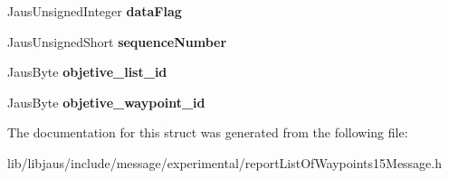 \begin{DoxyCompactItemize}
\item 
\hypertarget{struct_report_list_of_waypoints15_message_struct_affc0e770bcc48d1ed22a4da96e2a566c}{\-Jaus\-Unsigned\-Integer {\bfseries data\-Flag}}\label{struct_report_list_of_waypoints15_message_struct_affc0e770bcc48d1ed22a4da96e2a566c}

\item 
\hypertarget{struct_report_list_of_waypoints15_message_struct_ab9f2141cb0065ac1f93caf08f76dc0bc}{\-Jaus\-Unsigned\-Short {\bfseries sequence\-Number}}\label{struct_report_list_of_waypoints15_message_struct_ab9f2141cb0065ac1f93caf08f76dc0bc}

\item 
\hypertarget{struct_report_list_of_waypoints15_message_struct_a6d00d772650125322cbdd72819b0641d}{\-Jaus\-Byte {\bfseries objetive\-\_\-list\-\_\-id}}\label{struct_report_list_of_waypoints15_message_struct_a6d00d772650125322cbdd72819b0641d}

\item 
\hypertarget{struct_report_list_of_waypoints15_message_struct_a7bb4ffb237266fa2bf563a842f4b7848}{\-Jaus\-Byte {\bfseries objetive\-\_\-waypoint\-\_\-id}}\label{struct_report_list_of_waypoints15_message_struct_a7bb4ffb237266fa2bf563a842f4b7848}

\end{DoxyCompactItemize}


\-The documentation for this struct was generated from the following file\-:\begin{DoxyCompactItemize}
\item 
lib/libjaus/include/message/experimental/report\-List\-Of\-Waypoints15\-Message.\-h\end{DoxyCompactItemize}
